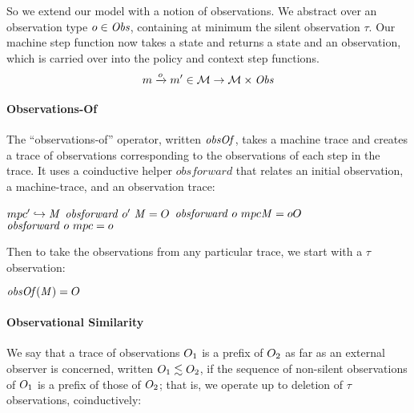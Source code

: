 \documentclass[acmsmall,review,anonymous]{acmart}\settopmatter{printfolios=true,printccs=false,printacmref=false}
\begin{document}
So we extend our model with a notion of observations. We abstract over an
observation type \(\obs \in \OBSS\), containing at minimum the silent observation
\(\tau\). Our machine step function now takes a state and returns a state and an observation,
which is carried over into the policy and context step functions.
%
\[\mach \stepsto[\obs] \mach' \in \MACHS \rightarrow \MACHS \times \OBSS \]
%

\paragraph*{Observations-Of}

The ``observations-of'' operator, written \(\obsof\), takes a machine trace and
creates a trace of observations corresponding to the observations of each step in
the trace. It uses a coinductive helper \(\mathit{obsforward}\) that relates an
initial observation, a machine-trace, and an observation trace:

              {\(\mpcstatename' \hookrightarrow \MPCT\)}
              {\(\mathit{obsforward} ~ \obs' ~ \MPCT = \obsT\)}
              {\(\mathit{obsforward} ~ \obs ~ \mpcstatename \MPCT = \obs\obsT\)}%
\judgment{}
         {\(\mathit{obsforward} ~ \obs ~ \mpcstatename = \obs\)}

Then to take the observations from any particular trace, we start with a \(\tau\) observation:

         {\(\obsof(\MPCT) = \obsT\)}

\paragraph*{Observational Similarity}

We say that a trace of observations $\obsT_1$ is a prefix of $\obsT_2$
as far as an external observer is concerned, written \(\obsT_1 \lesssim
\obsT_2\), if the sequence of
non-silent observations of $\obsT_1$ is a prefix of those of
$\obsT_2$; that is, we operate up to deletion of \(\tau\) observations,
coinductively:

\begin{minipage}{.3\textwidth}
  \judgment{}{\(\obsT \lesssim \obsT\)}
\end{minipage}
\begin{minipage}{.3\textwidth}
  \judgment{}{\(\tau \lesssim \obsT\)}
\end{minipage}
\begin{minipage}{.3\textwidth}
\end{minipage}
\end{document}
